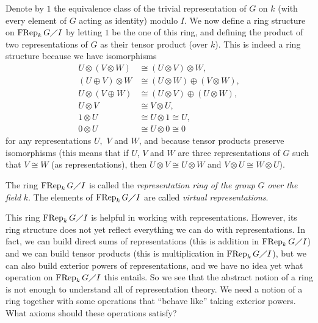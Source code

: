 \documentclass[numbers=enddot,12pt,final,onecolumn,notitlepage]{scrartcl}%
\begin{document}
Denote by $1$ the equivalence class of the trivial representation of $G$ on
$k$ (with every element of $G$ acting as identity) modulo $I$. We now define a
ring structure on $\operatorname*{FRep}_{k}G\diagup I$ by letting $1$ be the
one of this ring, and defining the product of two representations of $G$ as
their tensor product (over $k$). This is indeed a ring structure because we
have isomorphisms%
\begin{align*}
U\otimes\left(  V\otimes W\right)   &  \cong\left(  U\otimes V\right)  \otimes
W,\\
\left(  U\oplus V\right)  \otimes W  &  \cong\left(  U\otimes W\right)
\oplus\left(  V\otimes W\right)  ,\\
U\otimes\left(  V\oplus W\right)   &  \cong\left(  U\otimes V\right)
\oplus\left(  U\otimes W\right)  ,\\
U\otimes V  &  \cong V\otimes U,\\
1\otimes U  &  \cong U\otimes1\cong U,\\
0\otimes U  &  \cong U\otimes0\cong0
\end{align*}
for any representations $U,$ $V$ and $W$, and because tensor products preserve
isomorphisms (this means that if $U$, $V$ and $W$ are three representations of
$G$ such that $V\cong W$ (as representations), then $U\otimes V\cong U\otimes
W$ and $V\otimes U\cong W\otimes U$).

The ring $\operatorname*{FRep}_{k}G\diagup I$ is called the
\textit{representation ring of the group }$G$\textit{ over the field }$k$. The
elements of $\operatorname*{FRep}_{k}G\diagup I$ are called \textit{virtual
representations}.

This ring $\operatorname*{FRep}_{k}G\diagup I$ is helpful in working with
representations. However, its ring structure does not yet reflect everything
we can do with representations. In fact, we can build direct sums of
representations (this is addition in $\operatorname*{FRep}_{k}G\diagup I$) and
we can build tensor products (this is multiplication in $\operatorname*{FRep}%
_{k}G\diagup I$), but we can also build exterior powers of representations,
and we have no idea yet what operation on $\operatorname*{FRep}_{k}G\diagup I$
this entails. So we see that the abstract notion of a ring is not enough to
understand all of representation theory. We need a notion of a ring together
with some operations that ``behave like'' taking exterior powers. What axioms
should these operations satisfy?
\end{document}
